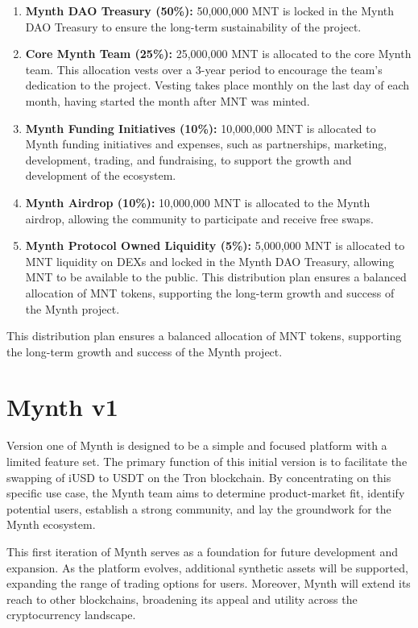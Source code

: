 \begin{enumerate}
\item
  \textbf{Mynth DAO Treasury (50\%):} 50,000,000 MNT is locked in the
  Mynth DAO Treasury to ensure the long-term sustainability of the
  project.
\item
  \textbf{Core Mynth Team (25\%):} 25,000,000 MNT is allocated to the
  core Mynth team. This allocation vests over a 3-year period to
  encourage the team's dedication to the project. Vesting takes place
  monthly on the last day of each month, having started the month after
  MNT was minted.
\item
  \textbf{Mynth Funding Initiatives (10\%):} 10,000,000 MNT is allocated
  to Mynth funding initiatives and expenses, such as partnerships,
  marketing, development, trading, and fundraising, to support the
  growth and development of the ecosystem.
\item
  \textbf{Mynth Airdrop (10\%):} 10,000,000 MNT is allocated to the
  Mynth airdrop, allowing the community to participate and receive free
  swaps.
\item
  \textbf{Mynth Protocol Owned Liquidity (5\%):} 5,000,000 MNT is
  allocated to MNT liquidity on DEXs and locked in the Mynth DAO
  Treasury, allowing MNT to be available to the public. This
  distribution plan ensures a balanced allocation of MNT tokens,
  supporting the long-term growth and success of the Mynth project.
\end{enumerate}

This distribution plan ensures a balanced allocation of MNT tokens,
supporting the long-term growth and success of the Mynth project.

\hypertarget{mynth-v1}{%
\section{Mynth v1}\label{mynth-v1}}

Version one of Mynth is designed to be a simple and focused platform
with a limited feature set. The primary function of this initial version
is to facilitate the swapping of iUSD to USDT on the Tron blockchain. By
concentrating on this specific use case, the Mynth team aims to
determine product-market fit, identify potential users, establish a
strong community, and lay the groundwork for the Mynth ecosystem.

This first iteration of Mynth serves as a foundation for future
development and expansion. As the platform evolves, additional synthetic
assets will be supported, expanding the range of trading options for
users. Moreover, Mynth will extend its reach to other blockchains,
broadening its appeal and utility across the cryptocurrency landscape.

